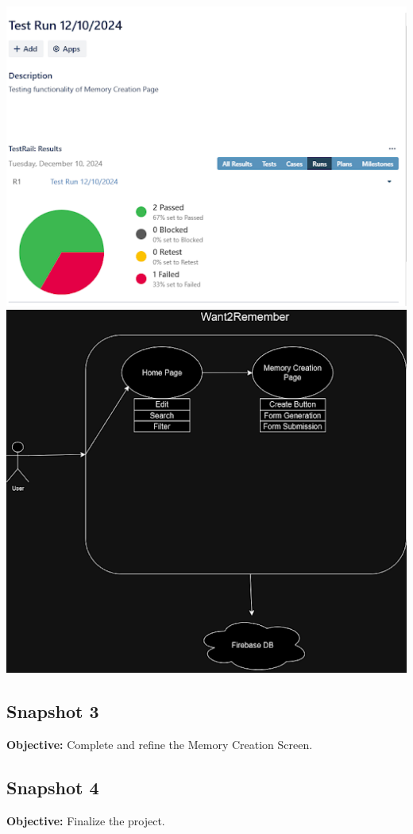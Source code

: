 \documentclass[12pt]{article}
\begin{document}
\includegraphics{snapshot2img3.png}
\includegraphics{snapshot2img4.png}

\subsection{Snapshot 3}
\textbf{Objective:} Complete and refine the Memory Creation Screen. 
\subsection{Snapshot 4}
\textbf{Objective:} Finalize the project.
\end{document}
